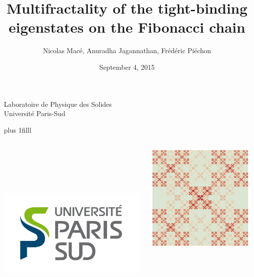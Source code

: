 \documentclass[xcolor=x11names,compress,professionalfonts]{beamer}
\newcommand{\btVFill}{\vskip0pt plus 1filll}%
\renewcommand{\(}{\begin{columns}}
\renewcommand{\)}{\end{columns}}
\newcommand{\<}[1]{\begin{column}{#1}}
\renewcommand{\>}{\end{column}}
\begin{document}
\begin{frame}
\title{Multifractality of the tight-binding eigenstates on the Fibonacci chain}


\author{ Nicolas Macé, Anuradha Jagannathan, Frédéric Piéchon}

\institute %
{
  Laboratoire de Physique des Solides\\
  Université Paris-Sud
}

\date{September 4, 2015}

\titlepage

\btVFill
\begin{columns}
\begin{column}{2cm}
~\\
~\\
~\\
~\\
\raggedright
\includegraphics[scale=.15]{LogoUPSUD.png}
\end{column}
\begin{column}{6cm}
\centering
\includegraphics[width=.5\textwidth]{illustration.pdf}

\end{column}
\end{columns}
\end{frame}
\end{document}

